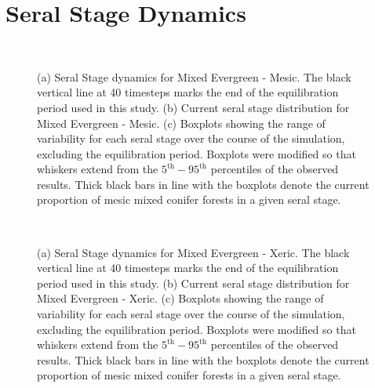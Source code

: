 \clearpage

\section{Seral Stage Dynamics}
\label{app:sec:seraldynamics}

\begin{figure}[!htbp]
  \centering
  \\
  \caption{(a) Seral Stage dynamics for Mixed Evergreen - Mesic. The black vertical line at 40 timesteps marks the end of the equilibration period used in this study. (b) Current seral stage distribution for Mixed Evergreen - Mesic. (c) Boxplots showing the range of variability for each seral stage over the course of the simulation, excluding the equilibration period. Boxplots were modified so that whiskers extend from the $5^{\text{th}} - 95^{\text{th}}$ percentiles of the observed results. Thick black bars in line with the boxplots denote the current proportion of mesic mixed conifer forests in a given seral stage.}
\label{fig:covcond_megm}
\end{figure}

\begin{figure}[!htbp]
  \centering
  \\
  \caption{(a) Seral Stage dynamics for Mixed Evergreen - Xeric. The black vertical line at 40 timesteps marks the end of the equilibration period used in this study. (b) Current seral stage distribution for Mixed Evergreen - Xeric. (c) Boxplots showing the range of variability for each seral stage over the course of the simulation, excluding the equilibration period. Boxplots were modified so that whiskers extend from the $5^{\text{th}} - 95^{\text{th}}$ percentiles of the observed results. Thick black bars in line with the boxplots denote the current proportion of mesic mixed conifer forests in a given seral stage.} 
  \label{fig:covcond_megx}
\end{figure}

